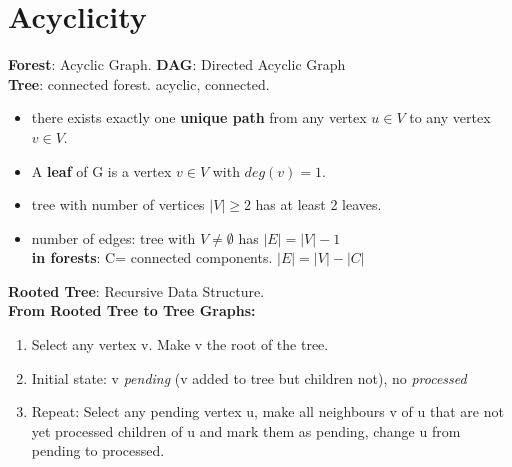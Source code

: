 \section*{Acyclicity}
\textbf{Forest}: Acyclic Graph. \textbf{DAG}: Directed Acyclic Graph \\
\textbf{Tree}: connected forest. acyclic, connected. \\
\begin{itemize}[noitemsep,topsep=0pt,leftmargin=*]
    \item there exists exactly one \textbf{unique path} from any vertex $u \in V$ to any vertex $v \in V$.
    \item A \textbf{leaf} of G is a vertex $v \in V$ with $deg(v) = 1$.
    \item tree with number of vertices $|V| \geq 2$ has at least 2 leaves. 
    \item number of edges: tree with $V \neq \emptyset$ has $|E| = |V| - 1$ \\
    \textbf{in forests}: C= connected components. $|E|=|V|-|C|$ 
\end{itemize}
\textbf{Rooted Tree}: Recursive Data Structure. \\ 
\fontsize{5pt}{5pt}\selectfont
\textbf{From Rooted Tree to Tree Graphs: } 
\begin{enumerate}[noitemsep,topsep=0pt,leftmargin=*]
    \item Select any vertex v. Make v the root of the tree.
    \item Initial state: v \textit{pending} (v added to tree but children not), no \textit{processed} 
    \item Repeat: Select any pending vertex u, make all neighbours v of u that are not yet processed children of u and mark them as pending, change u from pending to processed.
\end{enumerate}
\fontsize{7pt}{5pt}\selectfont

